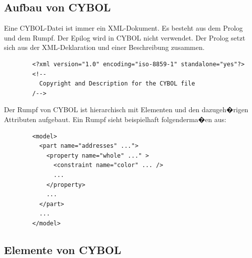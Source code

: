     \subsection{Aufbau von CYBOL}   
      Eine CYBOL-Datei ist immer ein XML-Dokument. Es besteht aus dem Prolog und dem Rumpf. 
      Der Epilog wird in CYBOL nicht verwendet. Der Prolog
      setzt sich aus der XML-Deklaration und einer Beschreibung zusammen. 
\begin{verbatim}
        <?xml version="1.0" encoding="iso-8859-1" standalone="yes"?>
        <!--
          Copyright and Description for the CYBOL file
        /-->
\end{verbatim}
      Der Rumpf von CYBOL ist hierarchisch mit Elementen und den dazugeh�rigen Attributen 
      aufgebaut.
      Ein Rumpf sieht beispielhaft folgenderma�en aus:
\begin{verbatim}
        <model>
          <part name="addresses" ...">
            <property name="whole" ..." >
              <constraint name="color" ... />
              ...
            </property>
            ...
          </part>
          ...
        </model>
\end{verbatim}

    \subsection{Elemente von CYBOL}


